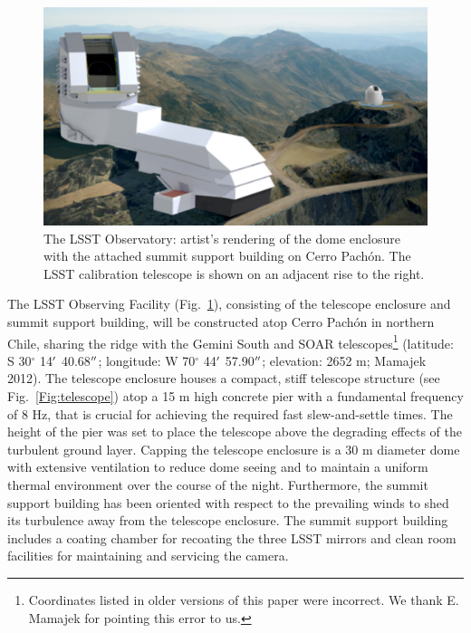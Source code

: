 \documentclass{emulateapj}
\begin{document}
\begin{figure}
\includegraphics[width=1.0\hsize,clip]{observatoryFull.pdf}
\caption{The LSST Observatory: artist's rendering of the dome enclosure 
with the attached summit support building on Cerro Pach\'{o}n. The LSST calibration 
telescope is shown on an adjacent rise to the right.} 
\label{Fig:observatory}
\end{figure}

The LSST Observing Facility (Fig.~\ref{Fig:observatory}),
consisting of the telescope enclosure and summit support building, will be constructed atop Cerro Pach\'{o}n in northern Chile,
sharing the ridge with the Gemini South and SOAR telescopes\footnote{Coordinates listed in older versions 
of this paper were incorrect. We thank E. Mamajek for pointing this error to us.} 
(latitude: S 30$^\circ$ 14$\mbox{$^\prime$}$ 40.68$\mbox{$^{\prime\prime}$}$; longitude: W 70$^\circ$ 44$\mbox{$^\prime$}$ 57.90$\mbox{$^{\prime\prime}$}$; elevation: 2652 m; 
Mamajek 2012).  The telescope enclosure houses a compact, stiff
telescope structure (see Fig.~\ref{Fig:telescope}) atop a 15 m high concrete pier
with a fundamental frequency of 8 Hz, that is crucial for achieving the required fast slew-and-settle times.  The height of the pier was set to place the telescope above the degrading 
effects of the turbulent ground layer.  Capping the telescope
enclosure is a 30 m diameter dome with extensive ventilation to reduce
dome seeing 
and to maintain a uniform thermal environment over the course of the night.  Furthermore, the summit support 
building has been oriented with respect to the prevailing winds to shed its turbulence away from the
telescope enclosure.  The summit support building includes a coating chamber for recoating the three LSST mirrors and 
clean room facilities for maintaining and servicing the camera.
\end{document}
